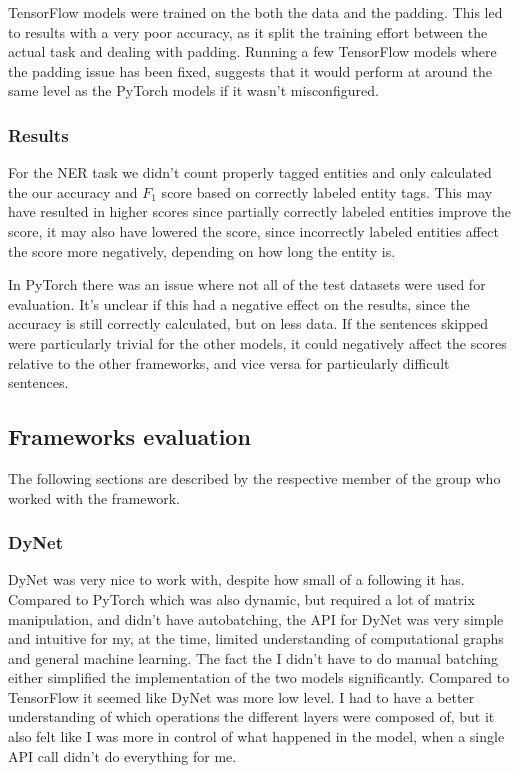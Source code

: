TensorFlow models were trained on the both the data and the padding. This led
to results with a very poor accuracy, as it split the training effort between
the actual task and dealing with padding. Running a few TensorFlow models where
the padding issue has been fixed, suggests that it would perform at around the
same level as the PyTorch models if it wasn't misconfigured.

\subsubsection{Results}

For the NER task we didn't count properly tagged entities and only calculated
the our accuracy and $F_1$ score based on correctly labeled entity tags. This
may have resulted in higher scores since partially correctly labeled entities
improve the score, it may also have lowered the score, since incorrectly labeled
entities affect the score more negatively, depending on how long the entity is. 

In PyTorch there was an issue where not all of the test datasets were used for
evaluation. It's unclear if this had a negative effect on the results, since the
accuracy is still correctly calculated, but on less data. If the sentences
skipped were particularly trivial for the other models, it could negatively
affect the scores relative to the other frameworks, and vice versa for
particularly difficult sentences.



\subsection{Frameworks evaluation}\label{subsec:frameworks}

The following sections are described by the respective member of the group who
worked with the framework. 

\subsubsection{DyNet}

DyNet was very nice to work with, despite how small of a following it has.
Compared to PyTorch which was also dynamic, but required a lot of matrix
manipulation, and didn't have autobatching, the API for DyNet was very simple
and intuitive for my, at the time, limited understanding of computational graphs
and general machine learning. The fact the I didn't have to do manual batching
either simplified the implementation of the two models significantly. Compared
to TensorFlow it seemed like DyNet was more low level. I had to have a better
understanding of which operations the different layers were composed of, but it
also felt like I was more in control of what happened in the model, when a
single API call didn't do everything for me.

